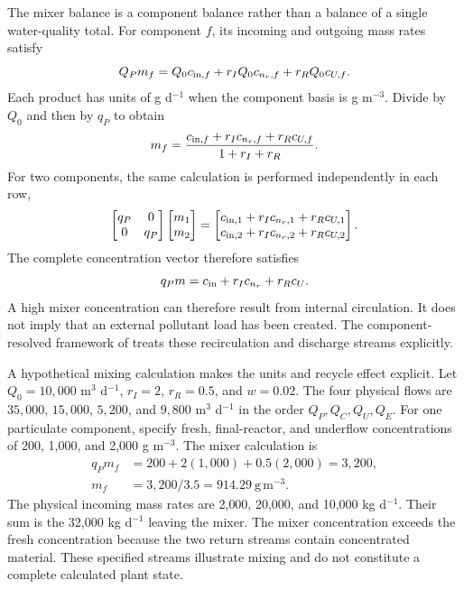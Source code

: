 The mixer balance is a component balance rather than a balance of a single water-quality total. For component $f$, its incoming and outgoing mass rates satisfy
\begin{equation}
Q_Pm_f=Q_0c_{{\rm in},f}+r_IQ_0c_{n_r,f}+r_RQ_0c_{U,f}.
\end{equation}
Each product has units of g d$^{-1}$ when the component basis is g m$^{-3}$. Divide by $Q_0$ and then by $q_P$ to obtain
\begin{equation}
m_f=\frac{c_{{\rm in},f}+r_Ic_{n_r,f}+r_Rc_{U,f}}{1+r_I+r_R}.
\end{equation}
For two components, the same calculation is performed independently in each row,
\begin{equation}
\begin{bmatrix}q_P&0\\0&q_P\end{bmatrix}
\begin{bmatrix}m_1\\m_2\end{bmatrix}
=\begin{bmatrix}c_{{\rm in},1}+r_Ic_{n_r,1}+r_Rc_{U,1}\\
c_{{\rm in},2}+r_Ic_{n_r,2}+r_Rc_{U,2}\end{bmatrix}.
\end{equation}
The complete concentration vector therefore satisfies
\begin{equation}
q_Pm=c_{\rm in}+r_Ic_{n_r}+r_Rc_U.
\label{eq:plant_mixer}
\end{equation}
A high mixer concentration can therefore result from internal circulation. It does not imply that an external pollutant load has been created. The component-resolved framework of \citet{Zhang2026} treats these recirculation and discharge streams explicitly.

A hypothetical mixing calculation makes the units and recycle effect explicit. Let $Q_0=10{,}000$ m$^3$ d$^{-1}$, $r_I=2$, $r_R=0.5$, and $w=0.02$. The four physical flows are $35{,}000$, $15{,}000$, $5{,}200$, and $9{,}800$ m$^3$ d$^{-1}$ in the order $Q_P,Q_C,Q_U,Q_E$. For one particulate component, specify fresh, final-reactor, and underflow concentrations of 200, 1{,}000, and 2{,}000 g m$^{-3}$. The mixer calculation is
\begin{align}
q_Pm_f&=200+2(1{,}000)+0.5(2{,}000)=3{,}200,\\
m_f&=3{,}200/3.5=914.29\ \mathrm{g\,m^{-3}}.
\end{align}
The physical incoming mass rates are 2{,}000, 20{,}000, and 10{,}000 kg d$^{-1}$. Their sum is the 32{,}000 kg d$^{-1}$ leaving the mixer. The mixer concentration exceeds the fresh concentration because the two return streams contain concentrated material. These specified streams illustrate mixing and do not constitute a complete calculated plant state.

